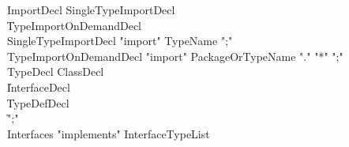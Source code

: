 \begin{grammar}
 ImportDecl  \:   SingleTypeImportDecl\\
    \|   TypeImportOnDemandDecl\\
 SingleTypeImportDecl  \:   \xcd"import"  TypeName  \xcd";"\\
 TypeImportOnDemandDecl  \:   \xcd"import"  PackageOrTypeName  \xcd"."  \xcd"*"  \xcd";"\\
 TypeDecl  \:   ClassDecl\\
    \|   InterfaceDecl\\
    \|   TypeDefDecl\\
    \|   \xcd";"\\
 Interfaces  \:   \xcd"implements"  InterfaceTypeList\\
\end{grammar}

\begin{grammar}


\end{grammar}
